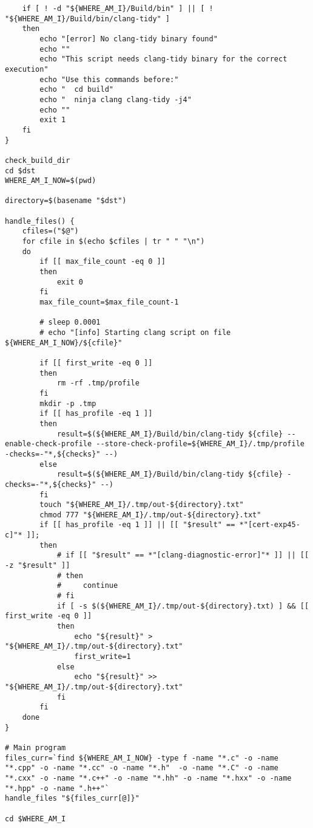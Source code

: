 \begin{code}
\begin{verbatim}
    if [ ! -d "${WHERE_AM_I}/Build/bin" ] || [ ! "${WHERE_AM_I}/Build/bin/clang-tidy" ]
    then
        echo "[error] No clang-tidy binary found"
        echo "" 
        echo "This script needs clang-tidy binary for the correct execution" 
        echo "Use this commands before:"
        echo "  cd build"
        echo "  ninja clang clang-tidy -j4"
        echo ""
        exit 1 
    fi 
}

check_build_dir
cd $dst
WHERE_AM_I_NOW=$(pwd)

directory=$(basename "$dst")

handle_files() {
    cfiles=("$@")
    for cfile in $(echo $cfiles | tr " " "\n")
    do
        if [[ max_file_count -eq 0 ]]
        then 
            exit 0
        fi
        max_file_count=$max_file_count-1

        # sleep 0.0001
        # echo "[info] Starting clang script on file ${WHERE_AM_I_NOW}/${cfile}"

        if [[ first_write -eq 0 ]]
        then 
            rm -rf .tmp/profile
        fi 
        mkdir -p .tmp 
        if [[ has_profile -eq 1 ]]
        then
            result=$(${WHERE_AM_I}/Build/bin/clang-tidy ${cfile} --enable-check-profile --store-check-profile=${WHERE_AM_I}/.tmp/profile -checks=-"*,${checks}" --) 
        else 
            result=$(${WHERE_AM_I}/Build/bin/clang-tidy ${cfile} -checks=-"*,${checks}" --) 
        fi 
        touch "${WHERE_AM_I}/.tmp/out-${directory}.txt"
        chmod 777 "${WHERE_AM_I}/.tmp/out-${directory}.txt"
        if [[ has_profile -eq 1 ]] || [[ "$result" == *"[cert-exp45-c]"* ]]; 
        then 
            # if [[ "$result" == *"[clang-diagnostic-error]"* ]] || [[ -z "$result" ]] 
            # then
            #     continue  
            # fi
            if [ -s $(${WHERE_AM_I}/.tmp/out-${directory}.txt) ] && [[ first_write -eq 0 ]]
            then
                echo "${result}" > "${WHERE_AM_I}/.tmp/out-${directory}.txt"
                first_write=1
            else     
                echo "${result}" >> "${WHERE_AM_I}/.tmp/out-${directory}.txt"
            fi 
        fi
    done 
}

# Main program
files_curr=`find ${WHERE_AM_I_NOW} -type f -name "*.c" -o -name "*.cpp" -o -name "*.cc" -o -name "*.h"  -o -name "*.C" -o -name "*.cxx" -o -name "*.c++" -o -name "*.hh" -o -name "*.hxx" -o -name "*.hpp" -o -name ".h++"`
handle_files "${files_curr[@]}"

cd $WHERE_AM_I
\end{verbatim}
\caption{Content of \lstinline{tests_apps_checker.sh}}
\end{code}

